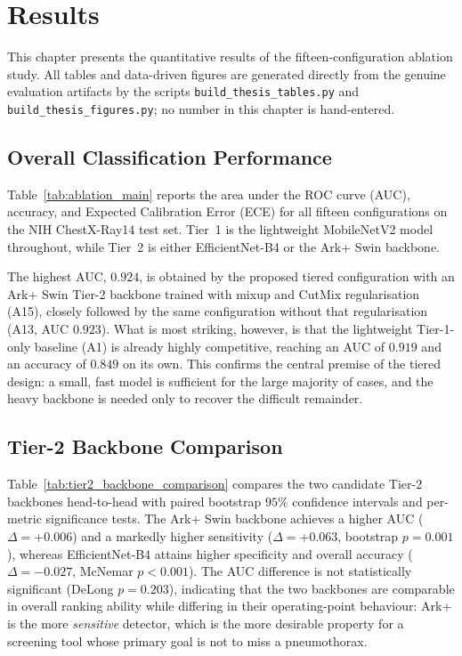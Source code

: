 \chapter{Results}
\label{ch:results}

This chapter presents the quantitative results of the fifteen-configuration ablation study. All tables and data-driven figures are generated directly from the genuine evaluation artifacts by the scripts \texttt{build\_thesis\_tables.py} and \texttt{build\_thesis\_figures.py}; no number in this chapter is hand-entered.

\section{Overall Classification Performance}
Table~\ref{tab:ablation_main} reports the area under the ROC curve (AUC), accuracy, and Expected Calibration Error (ECE) for all fifteen configurations on the NIH ChestX-Ray14 test set. Tier~1 is the lightweight MobileNetV2 model throughout, while Tier~2 is either EfficientNet-B4 or the Ark+ Swin backbone.

The highest AUC, $0.924$, is obtained by the proposed tiered configuration with an Ark+ Swin Tier-2 backbone trained with mixup and CutMix regularisation (A15), closely followed by the same configuration without that regularisation (A13, AUC $0.923$). What is most striking, however, is that the lightweight Tier-1-only baseline (A1) is already highly competitive, reaching an AUC of $0.919$ and an accuracy of $0.849$ on its own. This confirms the central premise of the tiered design: a small, fast model is sufficient for the large majority of cases, and the heavy backbone is needed only to recover the difficult remainder.



\section{Tier-2 Backbone Comparison}
Table~\ref{tab:tier2_backbone_comparison} compares the two candidate Tier-2 backbones head-to-head with paired bootstrap $95\%$ confidence intervals and per-metric significance tests. The Ark+ Swin backbone achieves a higher AUC ($\Delta = +0.006$) and a markedly higher sensitivity ($\Delta = +0.063$, bootstrap $p = 0.001$), whereas EfficientNet-B4 attains higher specificity and overall accuracy ($\Delta = -0.027$, McNemar $p < 0.001$). The AUC difference is not statistically significant (DeLong $p = 0.203$), indicating that the two backbones are comparable in overall ranking ability while differing in their operating-point behaviour: Ark+ is the more \emph{sensitive} detector, which is the more desirable property for a screening tool whose primary goal is not to miss a pneumothorax.

